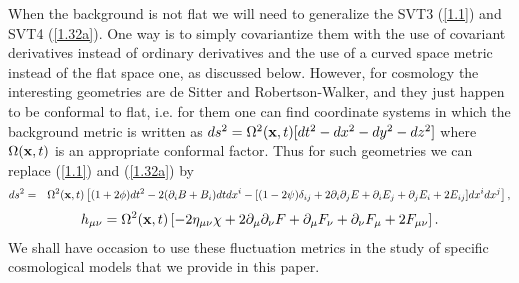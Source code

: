 When the background is not flat we will need to generalize the SVT3 (\ref{1.1}) and SVT4 (\ref{1.32a}). One way  is to simply covariantize them with the use of covariant derivatives instead of ordinary derivatives and the use of a curved space metric instead of the flat space one, as discussed below. However, for cosmology the interesting geometries are de Sitter and Robertson-Walker, and they just happen to be conformal to flat, i.e. for them one can find coordinate systems in which the background metric is written as $ds^2=\Omega^2({\bf x},t)[dt^2-dx^2-dy^2-dz^2]$ where $\Omega ({\bf x},t)$ is an appropriate conformal factor. Thus for such geometries we can replace (\ref{1.1}) and (\ref{1.32a}) by 
%
\begin{eqnarray}
ds^2 &=&\Omega^2({\bf x},t)\left[(1+2\phi) dt^2 -2(\partial_i B +B_i)dt dx^i - [(1-2\psi)\delta_{ij} +2\partial_i\partial_j E + \partial_i E_j + \partial_j E_i + 2E_{ij}]dx^i dx^j\right],
\label{1.42a}
\end{eqnarray}
%
%
\begin{eqnarray}
h_{\mu\nu}=\Omega^2({\bf x},t)\left[-2\eta_{\mu\nu}\chi+2\partial_{\mu}\partial_{\nu}F
+ \partial_{\mu}F_{\nu}+\partial_{\nu}F_{\mu}+2F_{\mu\nu}\right].
\label{1.43a}
\end{eqnarray}
%
We shall have occasion to use these fluctuation metrics in the study of specific cosmological models that we provide in this paper.
